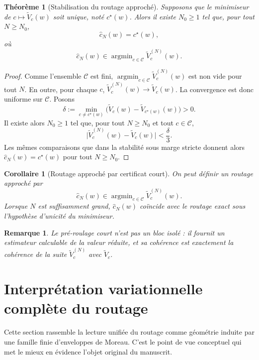 \documentclass[11pt,a4paper]{article}
\newtheorem{theorem}{Théorème}[section]
\newtheorem{corollary}{Corollaire}[section]
\newtheorem{remark}{Remarque}[section]
\DeclareMathOperator{\argmin}{argmin}
\newcommand{\Ccal}{\mathcal C}
\begin{document}
\begin{theorem}[Stabilisation du routage approché]
Supposons que le minimiseur de \(c\mapsto \widetilde V_c(w)\) soit unique, noté \(c^\star(w)\). Alors il existe \(N_0\ge 1\) tel que, pour tout \(N\ge N_0\),
\[
\hat c_N(w)=c^\star(w),
\]
où
\[
\hat c_N(w)\in\argmin_{c\in\Ccal}\widetilde V_c^{(N)}(w).
\]
\end{theorem}

\begin{proof}
Comme l'ensemble \(\Ccal\) est fini, \(\argmin_{c\in\Ccal}\widetilde V_c^{(N)}(w)\) est non vide pour tout \(N\). En outre, pour chaque \(c\), \(\widetilde V_c^{(N)}(w)\to \widetilde V_c(w)\). La convergence est donc uniforme sur \(\Ccal\). Posons
\[
\delta:=\min_{c\neq c^\star(w)}\bigl(\widetilde V_c(w)-\widetilde V_{c^\star(w)}(w)\bigr)>0.
\]
Il existe alors \(N_0\ge 1\) tel que, pour tout \(N\ge N_0\) et tout \(c\in\Ccal\),
\[
\bigl|\widetilde V_c^{(N)}(w)-\widetilde V_c(w)\bigr|<\frac{\delta}{3}.
\]
Les mêmes comparaisons que dans la stabilité sous marge stricte donnent alors \(\hat c_N(w)=c^\star(w)\) pour tout \(N\ge N_0\).
\end{proof}

\begin{corollary}[Routage approché par certificat court]
On peut définir un routage approché par
\[
\hat c_N(w)\in\argmin_{c\in\Ccal}\widetilde V_c^{(N)}(w).
\]
Lorsque \(N\) est suffisamment grand, \(\hat c_N(w)\) coïncide avec le routage exact sous l'hypothèse d'unicité du minimiseur.
\end{corollary}

\begin{remark}
Le pré-roulage court n'est pas un bloc isolé : il fournit un estimateur calculable de la valeur réduite, et sa cohérence est exactement la cohérence de la suite \(\widetilde V_c^{(N)}\) avec \(\widetilde V_c\).
\end{remark}

\section{Interprétation variationnelle complète du routage}

Cette section rassemble la lecture unifiée du routage comme géométrie induite par une famille finie d'enveloppes de Moreau. C'est le point de vue conceptuel qui met le mieux en évidence l'objet original du manuscrit.
\end{document}
